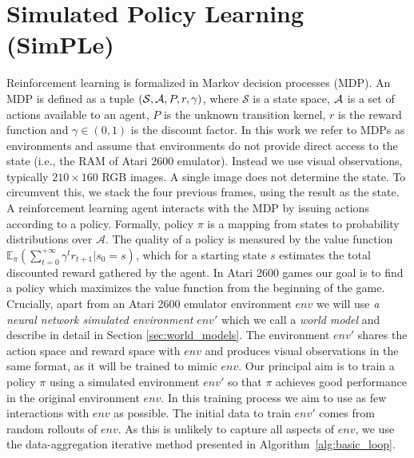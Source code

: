 \section{Simulated Policy Learning (SimPLe)}
\label{subsec:model}
\label{sec:mbrl}


Reinforcement learning is formalized in Markov decision processes (MDP). An MDP is defined as a tuple $(\mathcal{S}, {\mathcal A}, P, r, \gamma)$, where $\mathcal{S}$ is a state space, ${\mathcal A}$ is a set of actions available to an agent, $P$ is the unknown transition kernel, $r$ is the reward function and $\gamma\in (0,1)$ is the discount factor. 
In this work we refer to MDPs as environments and assume %
that environments do not provide direct access to the state (i.e., the RAM of Atari 2600 emulator). Instead we use visual observations, typically $210\times 160$ RGB images. A single image does not determine the state. To circumvent this, we stack the four previous frames, using the result as the state.
A reinforcement learning agent interacts with the MDP by issuing actions according to a policy. Formally, policy $\pi$ is a mapping from states to probability distributions over $\mathcal{A}$. The quality of a policy is measured by the value function $\mathbb{E}_{\pi}\left(\sum_{t=0}^{+\infty}\gamma^t r_{t+1}|s_0=s \right)$, which for a starting state $s$ estimates the total discounted reward gathered by the agent. In Atari 2600 games our goal is to find a policy which maximizes the value function from the beginning of the game.
Crucially, apart from an Atari 2600 emulator environment $env$ we will use \textit{a neural network simulated environment} $env'$ which we call a \textit{world model} and describe in detail in Section \ref{sec:world_models}. The environment $env'$ shares the action space and reward space with $env$ and produces visual observations in the same format, as it will be trained to mimic $env$.  Our principal aim is to
train a policy $\pi$ using a simulated environment $env'$ so that $\pi$ achieves good performance in the original environment $env$. In this training process we aim to use as few interactions with $env$ as possible. 
The initial data to train $env'$ comes from random rollouts of $env$. As this is unlikely to capture all aspects of $env$, we use the data-aggregation iterative method presented in Algorithm~\ref{alg:basic_loop}.

